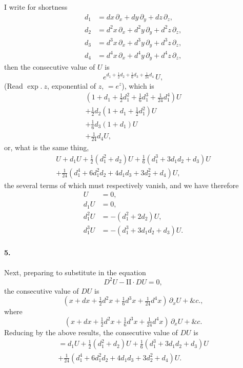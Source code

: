 \documentclass[11pt,a4paper]{book}
\begin{document}
I  write  for  shortness
\begin{align*}
d_1 &= dx\, \partial_x + dy\, \partial_y + dz\, \partial_z, \\
d_2 &= d^2x\, \partial_x + d^2y\, \partial_y + d^2z\, \partial_z, \\
d_3 &= d^3x\, \partial_x + d^3y\, \partial_y + d^3z\, \partial_z, \\
d_4 &= d^4x\, \partial_x + d^4y\, \partial_y + d^4z\, \partial_z,
\end{align*}
then  the  consecutive  value  of  $U$  is
\[
e^{d_1 + \frac{1}{2}d_2 + \frac{1}{6}d_3 + \frac{1}{24}d_4} \, U,
\]
(Read  $\exp.\ z$,  exponential  of  $z$,  $= e^z$),  which  is
\begin{multline*}
\left(1 + d_1 + \tfrac{1}{2}d_1^2 + \tfrac{1}{6}d_1^3 + \tfrac{1}{24}d_1^4\right) U \\
+ \tfrac{1}{2}d_2 \left(1 + d_1 + \tfrac{1}{2}d_1^2\right) U \\
+ \tfrac{1}{6}d_3 (1 + d_1) U \\
+ \tfrac{1}{24}d_4 U,
\end{multline*}
or,  what  is  the  same  thing,
\begin{multline*}
U + d_1 U + \tfrac{1}{2}(d_1^2 + d_2) U + \tfrac{1}{6}(d_1^3 + 3d_1 d_2 + d_3) U \\
+ \tfrac{1}{24}(d_1^4 + 6d_1^2 d_2 + 4d_1 d_3 + 3d_2^2 + d_4) U,
\end{multline*}
the  several  terms  of  which  must  respectively  vanish,  and  we  have  therefore
\begin{align*}
U &= 0, \\
d_1 U &= 0, \\
d_1^2 U &= -(d_1^2 + 2d_2) U, \\
d_1^3 U &= -(d_1^3 + 3d_1 d_2 + d_3) U.
\end{align*}

\paragraph{5.}
Next,  preparing  to  substitute  in  the  equation
\[
D^2 U - \mathrm{II} \cdot DU = 0,
\]
the  consecutive  value  of  $DU$  is
\[
(x + dx + \tfrac{1}{2}d^2x + \tfrac{1}{6}d^3x + \tfrac{1}{24}d^4x) \, \partial_x U + \&c.,
\]
where
\[
(x + dx + \tfrac{1}{2}d^2x + \tfrac{1}{6}d^3x + \tfrac{1}{24}d^4x) \, \partial_x U + \&c.
\]
Reducing  by  the  above  results,  the  consecutive  value  of  $DU$  is
\begin{multline*}
= d_1 U + \tfrac{1}{2}(d_1^2 + d_2) U + \tfrac{1}{6}(d_1^3 + 3d_1 d_2 + d_3) U \\
+ \tfrac{1}{24}(d_1^4 + 6d_1^2 d_2 + 4d_1 d_3 + 3d_2^2 + d_4) U.
\end{multline*}
\end{document}
